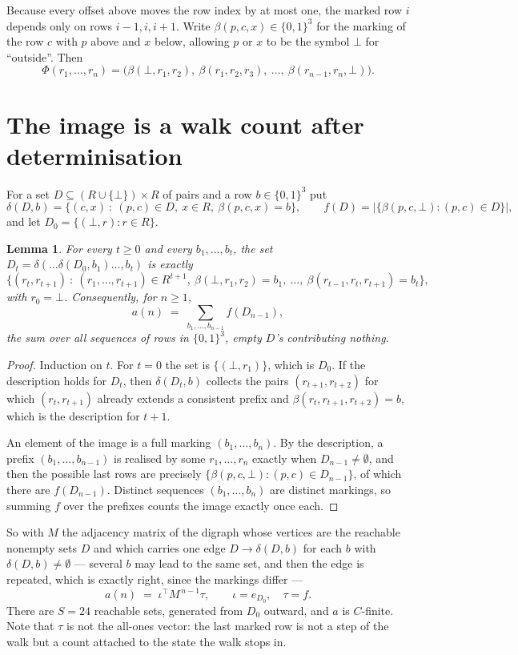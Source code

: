 \documentclass[11pt,a4paper]{article}
\theoremstyle{plain}
\newtheorem{lemma}[theorem]{Lemma}
\theoremstyle{definition}
\begin{document}
Because every offset above moves the row index by at most one, the marked row $i$ depends only
on rows $i-1,i,i+1$. Write $\beta(p,c,x)\in\{0,1\}^{3}$ for the marking of the row $c$
with $p$ above and $x$ below, allowing $p$ or $x$ to be the symbol $\bot$ for ``outside''.
Then
\[
\Phi(r_1,\dots,r_n)=\bigl(\beta(\bot,r_1,r_2),\ \beta(r_1,r_2,r_3),\ \dots,\
\beta(r_{n-1},r_n,\bot)\bigr).
\]

\section{The image is a walk count after determinisation}

For a set $D\subseteq(R\cup\{\bot\})\times R$ of pairs and a row $b\in\{0,1\}^{3}$ put
\[
\delta(D,b)=\{(c,x)\ :\ (p,c)\in D,\ x\in R,\ \beta(p,c,x)=b\},\qquad
f(D)=\bigl|\{\beta(p,c,\bot):(p,c)\in D\}\bigr| ,
\]
and let $D_0=\{(\bot,r):r\in R\}$.

\begin{lemma}\label{lem:det}
For every $t\ge0$ and every $b_1,\dots,b_t$, the set
$D_t=\delta(\dots\delta(D_0,b_1)\dots,b_t)$ is exactly
\[
\{(r_t,r_{t+1})\ :\ (r_1,\dots,r_{t+1})\in R^{t+1},\ \beta(\bot,r_1,r_2)=b_1,\ \dots,\
\beta(r_{t-1},r_t,r_{t+1})=b_t\} ,
\]
with $r_0=\bot$. Consequently, for $n\ge1$,
\[
a(n)\;=\;\sum_{b_1,\dots,b_{n-1}}f(D_{n-1}),
\]
the sum over all sequences of rows in $\{0,1\}^{3}$, empty $D$'s contributing nothing.
\end{lemma}

\begin{proof}
Induction on $t$. For $t=0$ the set is $\{(\bot,r_1)\}$, which is $D_0$. If the description
holds for $D_t$, then $\delta(D_t,b)$ collects the pairs $(r_{t+1},r_{t+2})$ for which
$(r_t,r_{t+1})$ already extends a consistent prefix and
$\beta(r_t,r_{t+1},r_{t+2})=b$, which is the description for $t+1$.

An element of the image is a full marking $(b_1,\dots,b_n)$. By the description, a prefix
$(b_1,\dots,b_{n-1})$ is realised by some $r_1,\dots,r_n$ exactly when $D_{n-1}\neq
\emptyset$, and then the possible last rows are precisely
$\{\beta(p,c,\bot):(p,c)\in D_{n-1}\}$, of which there are $f(D_{n-1})$. Distinct
sequences $(b_1,\dots,b_n)$ are distinct markings, so summing $f$ over the prefixes counts the
image exactly once each.
\end{proof}

So with $M$ the adjacency matrix of the digraph whose vertices are the reachable nonempty sets
$D$ and which carries one edge $D\to\delta(D,b)$ for each $b$ with $\delta(D,b)\neq\emptyset$
--- several $b$ may lead to the same set, and then the edge is repeated, which is exactly
right, since the markings differ ---
\[
a(n)\;=\;\iota^{\!\top}M^{\,n-1}\tau,\qquad \iota=e_{D_0},\quad \tau=f .
\]
There are $S=24$ reachable sets, generated from $D_0$ outward, and $a$ is $C$-finite. Note
that $\tau$ is not the all-ones vector: the last marked row is not a step of the walk but a
count attached to the state the walk stops in.
\end{document}
